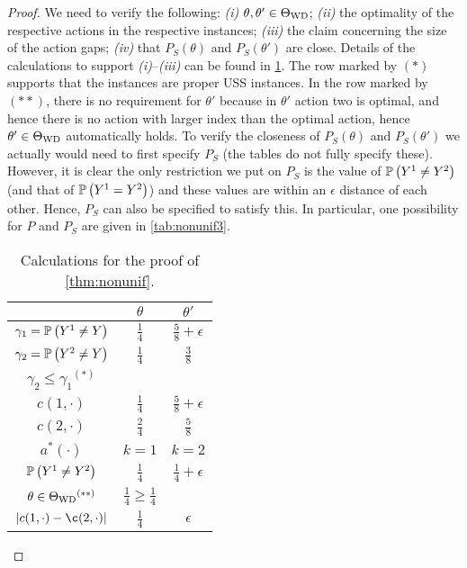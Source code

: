 \begin{proof}
We need to verify the following:
{\em (i)} $\theta,\theta'\in \Theta_{\mathrm{WD}}$;
{\em (ii)} the optimality of the respective actions in the respective instances;
{\em (iii)} the claim concerning the size of the action gaps;
{\em (iv)} that $P_S(\theta)$ and $P_S(\theta')$ are close.
Details of the calculations to support {\em (i)}--{\em (iii)} can be found in \cref{tab:nonunif2}.
The row marked by $(*)$ supports that the instances are proper USS instances.
In the row marked by $(**)$, there is no requirement for $\theta'$ because 
in $\theta'$ action two is optimal, and hence there is no action with larger index 
than the optimal action, hence $\theta'\in \Theta_{\mathrm{WD}}$ automatically holds.
To verify the closeness of $P_S(\theta)$ and $P_S(\theta')$ we actually 
would need to first specify $P_S$ (the tables do not fully specify these).
However, it is clear the only restriction we put on $P_S$ is the value of $\mathbb{P}\left(Y^1\ne Y^2\right)$ (and
that of $\mathbb{P}\left(Y^1=Y^2\right)$) and these values are within an $\epsilon$ distance of each other.
Hence, $P_S$ can also be specified to satisfy this. In particular, one possibility for $P$ and $P_S$ are given in \cref{tab:nonunif3}.
\bgroup
\def\arraystretch{1.5}
\begin{table}[]
	\centering
	\begin{tabular}{|c|c|c|}
		\hline
		& $\theta$                & $\theta'$ \\ \hline
		$\gamma_1 = \mathbb{P}\left(Y^1\ne Y\right)$ & $\frac{1}{4}$           & $\frac{5}{8}+\epsilon$ \\ \hline
		$\gamma_2 = \mathbb{P}\left(Y^2\ne Y\right)$ & $\frac{1}{4}$           & $\frac{3}{8}$ \\ \hline
		$\gamma_2 \le \gamma_1 \mbox{}^{(*)}$        & \checkmark           & \checkmark \\ \hline
		$c(1,\cdot)$                                 & $\frac{1}{4}$           & $\frac{5}{8}+\epsilon$ \\ \hline
		$c(2,\cdot)$                                 & $\frac{2}{4}$           & $\frac{5}{8}$ \\ \hline
		$a^*(\cdot)$                                 & $k=1$                   & $k=2$ \\ \hline
		$\mathbb{P}\left(Y^1\ne Y^2\right)$                   & $\frac{1}{4}$         & $\frac{1}{4}+\epsilon$ \\ \hline
		$\theta \in \Theta_{\mathrm{WD}}  \mbox{}^{(**)}$                        & $\frac{1}{4}\ge \frac14$ \checkmark & \checkmark \\ \hline
		$|c(1,\cdot)-\c(2,\cdot)|$              & $\frac{1}{4}$         & $\epsilon$ \\ \hline
	\end{tabular}
	\vspace*{0.1in}
	\caption{Calculations for the proof of \cref{thm:nonunif}.}
	\label{tab:nonunif2}
\end{table}
\egroup


\end{proof}
